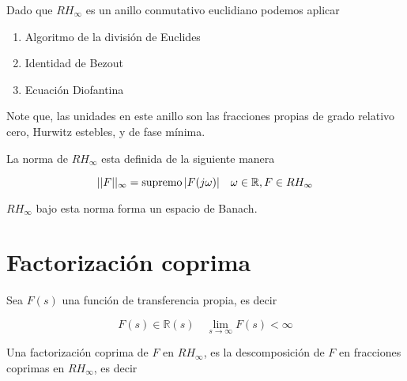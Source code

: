         Dado que $RH_{\infty}$ es un anillo conmutativo euclidiano podemos aplicar

        \begin{enumerate}
            \item Algoritmo de la división de Euclides
            \item Identidad de Bezout
            \item Ecuación Diofantina
        \end{enumerate}

        Note que, las unidades en este anillo son las fracciones propias de grado relativo cero, Hurwitz estebles, y de fase mínima.

        \begin{definicion}
            La norma de $RH_{\infty}$ esta definida de la siguiente manera

            \begin{equation}
                ||F||_{\infty} = \operatorname{supremo}{|F(j\omega)|} \quad \omega \in \mathbb{R}, F \in RH_{\infty}
            \end{equation}

            $RH_{\infty}$ bajo esta norma forma un espacio de Banach.
        \end{definicion}




    \section{Factorización coprima}

        Sea $F(s)$ una función de transferencia propia, es decir

        \begin{equation*}
            F(s) \in \mathbb{R}(s) \quad \lim_{s \to \infty} F(s) < \infty
        \end{equation*}

        Una factorización coprima de $F$ en $RH_{\infty}$, es la descomposición de $F$ en fracciones coprimas en $RH_{\infty}$, es decir

